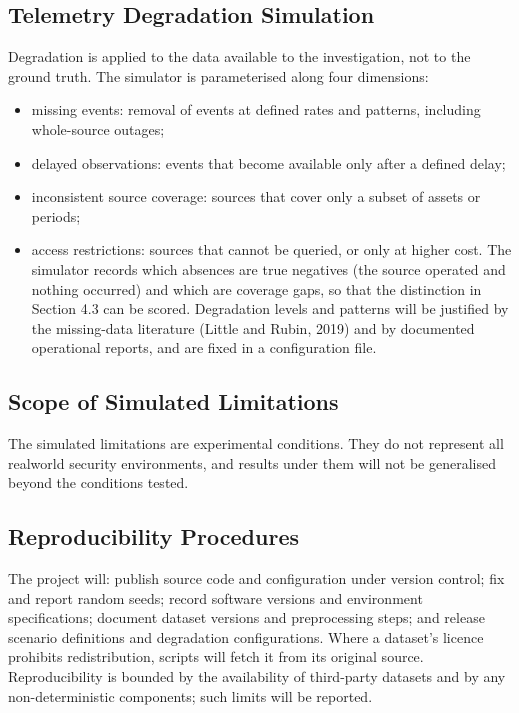 \documentclass[a4paper,11pt,oneside]{article}
\begin{document}
\subsection{Telemetry Degradation Simulation}
Degradation is applied to the data available to the investigation, not to the ground truth. The simulator is parameterised along four dimensions:
\begin{itemize}[leftmargin=*, itemsep=2pt, topsep=3pt]
\item missing events: removal of events at defined rates and patterns, including whole-source outages;
\item delayed observations: events that become available only after a defined delay;
\item inconsistent source coverage: sources that cover only a subset of assets or periods;
\item access restrictions: sources that cannot be queried, or only at higher cost.
The simulator records which absences are true negatives (the source operated and nothing occurred) and which are coverage gaps, so that the distinction in Section 4.3 can be scored. Degradation levels and patterns will be justified by the missing-data literature (Little and Rubin, 2019) and by documented operational reports, and are fixed in a configuration file.
\end{itemize}
\subsection{Scope of Simulated Limitations}
The simulated limitations are experimental conditions. They do not represent all realworld security environments, and results under them will not be generalised beyond the conditions tested.
\subsection{Reproducibility Procedures}
The project will: publish source code and configuration under version control; fix and report random seeds; record software versions and environment specifications; document dataset versions and preprocessing steps; and release scenario definitions and degradation configurations. Where a dataset’s licence prohibits redistribution, scripts will fetch it from its original source. Reproducibility is bounded by the availability of third-party datasets and by any non-deterministic components; such limits will be reported.
\end{document}
